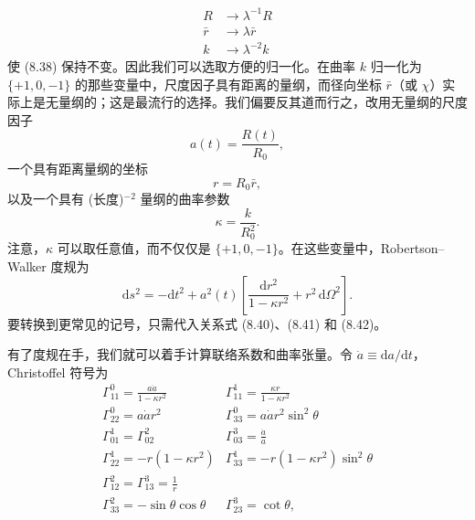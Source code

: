 \begin{equation*}
\begin{aligned}
R &\to \lambda^{-1}R\\
\bar{r} &\to \lambda\bar{r}\\
k &\to \lambda^{-2}k
\end{aligned}
\tag{8.39}
\end{equation*}
使 (8.38) 保持不变。因此我们可以选取方便的归一化。在曲率 $k$ 归一化为 $\{+1,0,-1\}$ 的那些变量中，尺度因子具有距离的量纲，而径向坐标 $\bar{r}$（或 $\chi$）实际上是无量纲的；这是最流行的选择。我们偏要反其道而行之，改用无量纲的尺度因子
\begin{equation*}
a(t) = \frac{R(t)}{R_0},
\tag{8.40}
\end{equation*}
一个具有距离量纲的坐标
\begin{equation*}
r = R_0\bar{r},
\tag{8.41}
\end{equation*}
以及一个具有 (长度)$^{-2}$ 量纲的曲率参数
\begin{equation*}
\kappa = \frac{k}{R_0^2}.
\tag{8.42}
\end{equation*}
注意，$\kappa$ 可以取任意值，而不仅仅是 $\{+1,0,-1\}$。在这些变量中，Robertson–Walker 度规为
\begin{equation*}
\boxed{\;\mathrm{d}s^2 = -\mathrm{d}t^2 + a^2(t)\left[\frac{\mathrm{d}r^2}{1-\kappa r^2} + r^2\,\mathrm{d}\Omega^2\right].\;}
\tag{8.43}
\end{equation*}
要转换到更常见的记号，只需代入关系式 (8.40)、(8.41) 和 (8.42)。

有了度规在手，我们就可以着手计算联络系数和曲率张量。令 $\dot{a}\equiv \mathrm{d}a/\mathrm{d}t$，Christoffel 符号为
\begin{equation*}
\begin{array}{ll}
\displaystyle \Gamma^0_{11} = \frac{a\dot{a}}{1-\kappa r^2} & \displaystyle \Gamma^1_{11} = \frac{\kappa r}{1-\kappa r^2}\\[10pt]
\displaystyle \Gamma^0_{22} = a\dot{a}r^2 & \displaystyle \Gamma^0_{33} = a\dot{a}r^2\sin^2\theta\\[6pt]
\displaystyle \Gamma^1_{01} = \Gamma^2_{02} & \displaystyle \Gamma^3_{03} = \frac{\dot{a}}{a}\\[6pt]
\displaystyle \Gamma^1_{22} = -r\left(1-\kappa r^2\right) & \displaystyle \Gamma^1_{33} = -r\left(1-\kappa r^2\right)\sin^2\theta\\[6pt]
\displaystyle \Gamma^2_{12} = \Gamma^3_{13} = \frac{1}{r} & \\[6pt]
\displaystyle \Gamma^2_{33} = -\sin\theta\cos\theta & \displaystyle \Gamma^3_{23} = \cot\theta,
\end{array}
\tag{8.44}
\end{equation*}

